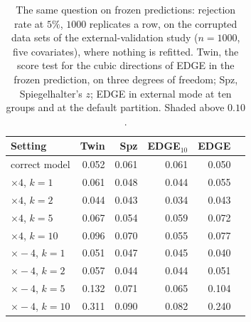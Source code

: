 \begin{table}[htbp]\centering\small
\caption{The same question on frozen predictions: rejection rate at $5\%$, $1000$ replicates a row,
on the corrupted data sets of the external-validation study ($n=1000$, five covariates), where nothing
is refitted. Twin, the score test for the cubic directions of EDGE in the frozen prediction, on three
degrees of freedom; Spz, Spiegelhalter's $z$; EDGE in external mode at ten groups and at the default
partition. Shaded above $0.10$.}
\label{tab:twext}
\begin{tabular}{lrrrrr}\hline
Setting & Twin & Spz & EDGE$_{10}$ & EDGE \\ \hline
correct model & 0.052 & 0.061 & 0.061 & 0.050 \\
$\times4$, $k=1$ & 0.061 & 0.048 & 0.044 & 0.055 \\
$\times4$, $k=2$ & 0.044 & 0.043 & 0.034 & 0.043 \\
$\times4$, $k=5$ & 0.067 & 0.054 & 0.059 & 0.072 \\
$\times4$, $k=10$ & 0.096 & 0.070 & 0.055 & 0.077 \\
$\times-4$, $k=1$ & 0.051 & 0.047 & 0.045 & 0.040 \\
$\times-4$, $k=2$ & 0.057 & 0.044 & 0.044 & 0.051 \\
$\times-4$, $k=5$ & \cellcolor{black!12}0.132 & 0.071 & 0.065 & \cellcolor{black!12}0.104 \\
$\times-4$, $k=10$ & \cellcolor{black!12}0.311 & 0.090 & 0.082 & \cellcolor{black!12}0.240 \\
\hline\end{tabular}\end{table}
